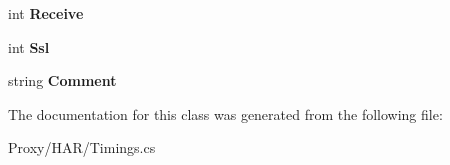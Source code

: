 \begin{DoxyCompactItemize}
\item 
\hypertarget{class_proto_test_1_1_golem_1_1_proxy_1_1_h_a_r_1_1_timings_af0aa794fd8147289decfa4f98435a3c8}{int {\bfseries Receive}}\label{class_proto_test_1_1_golem_1_1_proxy_1_1_h_a_r_1_1_timings_af0aa794fd8147289decfa4f98435a3c8}

\item 
\hypertarget{class_proto_test_1_1_golem_1_1_proxy_1_1_h_a_r_1_1_timings_ad112019057a3f8a3bbc449637153227a}{int {\bfseries Ssl}}\label{class_proto_test_1_1_golem_1_1_proxy_1_1_h_a_r_1_1_timings_ad112019057a3f8a3bbc449637153227a}

\item 
\hypertarget{class_proto_test_1_1_golem_1_1_proxy_1_1_h_a_r_1_1_timings_a063a84868cebbdc9b4613b3860e1c879}{string {\bfseries Comment}}\label{class_proto_test_1_1_golem_1_1_proxy_1_1_h_a_r_1_1_timings_a063a84868cebbdc9b4613b3860e1c879}

\end{DoxyCompactItemize}


The documentation for this class was generated from the following file\-:\begin{DoxyCompactItemize}
\item 
Proxy/\-H\-A\-R/Timings.\-cs\end{DoxyCompactItemize}

